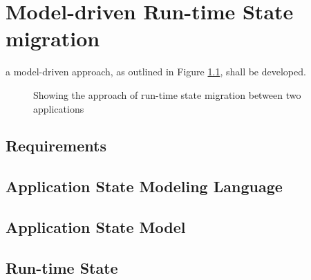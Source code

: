 \chapter{Model-driven Run-time State migration}
\label{ch:model_driven}
a model-driven approach, as outlined in Figure \ref{fig:solution}, shall be developed. 

\begin{figure}[!b]
    
    \caption{Showing the approach of run-time state migration between two applications }
    \label{fig:solution}
\end{figure}

\newpage

\section{Requirements}


\section{Application State Modeling Language}


\section{Application State Model}


\section{Run-time State}
